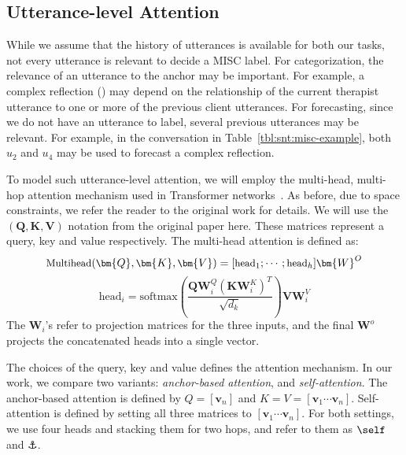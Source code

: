 \subsection{Utterance-level Attention}
\label{ssec:sentence_att}
While we assume that the history of utterances is available for both
our tasks, not every utterance is relevant to decide a MISC label.
%
For categorization, the relevance of an utterance to the anchor may
be important. For example, a complex reflection (\REC) may depend on
the relationship of the current therapist utterance to one or more
of the previous client utterances. For forecasting, since we do not
have an utterance to label, several previous utterances may
be relevant. For example, in the conversation in
Table~\ref{tbl:snt:misc-example}, both $u_2$ and $u_4$ may be used to
forecast a complex reflection.

To model such utterance-level attention, we will employ the
multi-head, multi-hop attention mechanism used in Transformer
networks~\cite{NIPS2017_7181}. As before, due to space constraints,
we refer the reader to the original work for details. We will use
the $(\bm{Q}, \bm{K}, \bm{V})$ notation from the original paper
here. These matrices represent a query, key and value
respectively. The multi-head attention is defined as:
%
\begin{equation}
\label{eq:multihead_attention}
{\small \text{Multihead}(\bm{Q},\bm{K},\bm{V}) = [\text{head}_{1};\cdots; \text{head}_{h}]\bm{W}^{O}}
\end{equation}
\begin{equation}
 \text{head}_{i} = \text{softmax}\left(\frac{\bm{Q}\bm{W}^{Q}_{i}\left(\bm{K}\bm{W}^{K}_{i}\right)^T}{\sqrt{d_{k}}}\right)\bm{V}\bm{W}^{V}_{i}
\end{equation}
The $\bm{W}_i$'s refer to projection matrices for the three inputs,
and the final $\bm{W}^o$ projects the concatenated heads into a
single vector.

The choices of the query, key and value defines the attention
mechanism. In our work, we compare two variants: {\em anchor-based
  attention}, and {\em self-attention}. The anchor-based attention
is defined by $Q = [\bm{v}_{n}]$ and
$K=V=[\bm{v}_{1} \cdots \bm{v}_{n}]$.  Self-attention is defined by
setting all three matrices to $[\bm{v}_{1} \cdots \bm{v}_{n}]$.
%
For both settings, we use four heads and stacking them for two hops,
and refer to them as $\self$ and $\anchor$.


